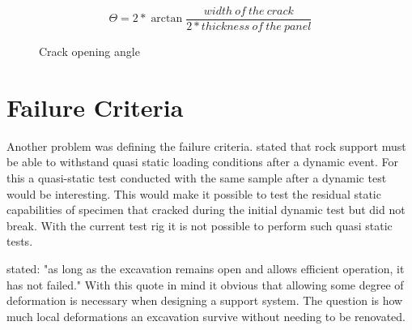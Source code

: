 \begin{equation}\label{eq:theta}
    \Theta = 2 * \arctan{ \frac{width ~of~the~crack}{2 * thickness~of~the~panel}}
\end{equation}

\begin{figure}
\centering

\caption{Crack opening angle}
\label{fig:crack}
\end{figure}


\section{Failure Criteria}
Another problem was defining the failure criteria. \textcite{canada96} stated that rock support must be able to withstand quasi static loading conditions after a dynamic event.  %
For this a quasi-static test conducted with the same sample after a dynamic test would be interesting. This would make it possible to test the residual static capabilities of specimen that cracked during the initial dynamic test but did not break. With the current test rig it is not possible to perform such quasi static tests. 


\textcite[344]{stacey01} stated: "as long as the excavation remains open and allows efficient operation, it has not failed." %
With this quote in mind it obvious that allowing some degree of deformation is necessary when designing a support system. The question is how much local deformations an excavation survive without needing to be renovated.

